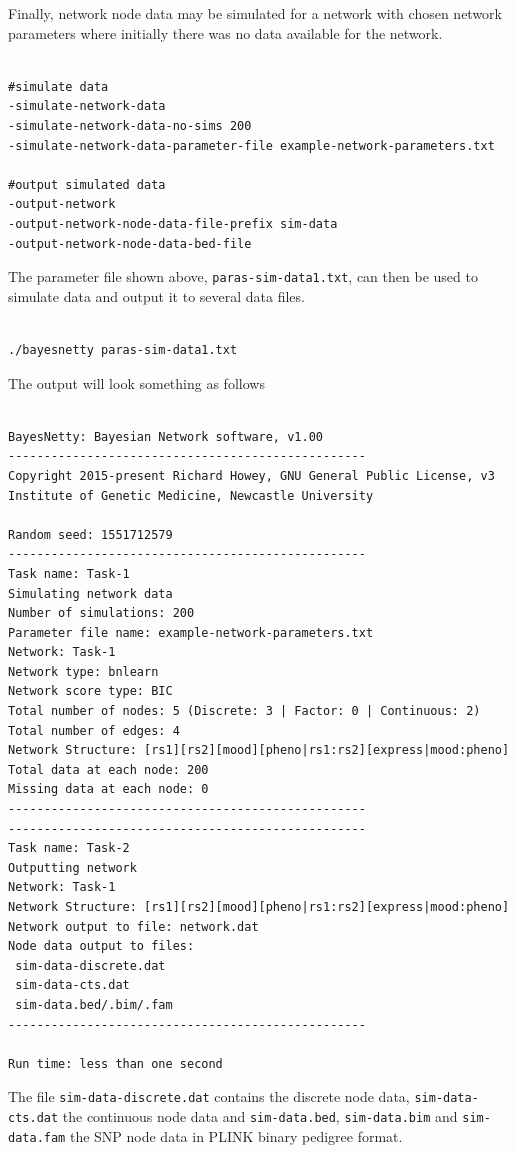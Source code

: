\documentclass[a4paper,12pt]{article}
\newcommand{\code}[1]{{\footnotesize{{\tt #1}}}}
\begin{document}
Finally, network node data may be simulated for a network with chosen network parameters where initially there was no data available for the network. 
\vspace{0.35cm} \begin{lstlisting}

#simulate data
-simulate-network-data
-simulate-network-data-no-sims 200
-simulate-network-data-parameter-file example-network-parameters.txt

#output simulated data
-output-network
-output-network-node-data-file-prefix sim-data
-output-network-node-data-bed-file

\end{lstlisting} \vspace{0.35cm}
The parameter file shown above, \code{paras-sim-data1.txt}, can then be used to simulate data and output it to several data files. 
\vspace{0.35cm} \begin{lstlisting}

./bayesnetty paras-sim-data1.txt

\end{lstlisting} \vspace{0.35cm}
The output will look something as follows 
\vspace{0.35cm} \begin{lstlisting}

BayesNetty: Bayesian Network software, v1.00
--------------------------------------------------
Copyright 2015-present Richard Howey, GNU General Public License, v3
Institute of Genetic Medicine, Newcastle University

Random seed: 1551712579
--------------------------------------------------
Task name: Task-1
Simulating network data
Number of simulations: 200
Parameter file name: example-network-parameters.txt
Network: Task-1
Network type: bnlearn
Network score type: BIC
Total number of nodes: 5 (Discrete: 3 | Factor: 0 | Continuous: 2)
Total number of edges: 4
Network Structure: [rs1][rs2][mood][pheno|rs1:rs2][express|mood:pheno]
Total data at each node: 200
Missing data at each node: 0
--------------------------------------------------
--------------------------------------------------
Task name: Task-2
Outputting network
Network: Task-1
Network Structure: [rs1][rs2][mood][pheno|rs1:rs2][express|mood:pheno]
Network output to file: network.dat
Node data output to files:
 sim-data-discrete.dat
 sim-data-cts.dat
 sim-data.bed/.bim/.fam
--------------------------------------------------

Run time: less than one second

\end{lstlisting} \vspace{0.35cm}
The file \code{sim-data-discrete.dat} contains the discrete node data, \code{sim-data-cts.dat} the continuous node data and \code{sim-data.bed}, \code{sim-data.bim} and \code{sim-data.fam} the SNP node data in PLINK binary pedigree format. 
\end{document}
